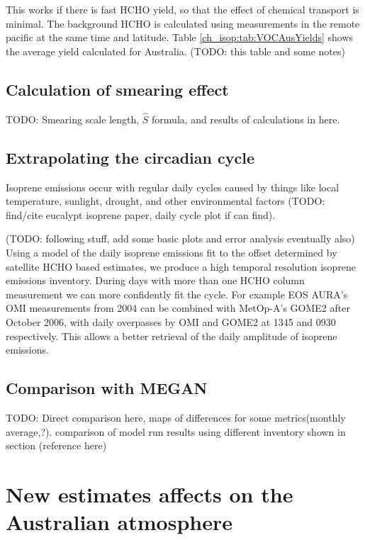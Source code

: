     This works if there is fast HCHO yield, so that the effect of chemical transport is minimal.
    The background HCHO is calculated using measurements in the remote pacific at the same time and latitude.
    Table \ref{ch_isop:tab:VOCAusYields} shows the average yield calculated for Australia. (TODO: this table and some notes)
    
  \subsection{Calculation of smearing effect}
    TODO: Smearing scale length, $\hat{S}$ formula, and results of calculations in here.
    
    
  \subsection{Extrapolating the circadian cycle}
    Isoprene emissions occur with regular daily cycles caused by things like local temperature, sunlight, drought, and other environmental factors (TODO: find/cite eucalypt isoprene paper, daily cycle plot if can find).
    
    (TODO: following stuff, add some basic plots and error analysis eventually also)
    Using a model of the daily isoprene emissions fit to the offset determined by satellite HCHO based estimates, we produce a high temporal resolution isoprene emissions inventory.
    During days with more than one HCHO column measurement we can more confidently fit the cycle. 
    For example EOS AURA's OMI measurements from 2004 can be combined with MetOp-A's GOME2 after October 2006, with daily overpasses by OMI and GOME2 at 1345 and 0930 respectively.
    This allows a better retrieval of the daily amplitude of isoprene emissions.
    
  \subsection{Comparison with MEGAN}
    TODO: Direct comparison here, maps of differences for some metrics(monthly average,?). comparison of model run results using different inventory shown in section (reference here)

\section{New estimates affects on the Australian atmosphere}

